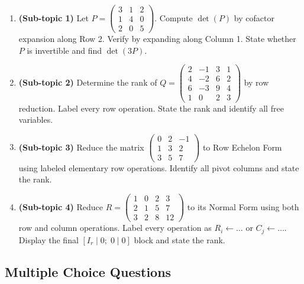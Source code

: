 \documentclass[12pt,a4paper]{article}
\begin{document}
\begin{enumerate}[label=\textbf{D\arabic*.}]
  \item \textbf{(Sub-topic 1)} Let $P = \begin{pmatrix}3&1&2\\1&4&0\\2&0&5\end{pmatrix}$. Compute $\det(P)$ by cofactor expansion along Row 2. Verify by expanding along Column 1. State whether $P$ is invertible and find $\det(3P)$.

  \item \textbf{(Sub-topic 2)} Determine the rank of $Q = \begin{pmatrix}2&-1&3&1\\4&-2&6&2\\6&-3&9&4\\1&0&2&3\end{pmatrix}$ by row reduction. Label every row operation. State the rank and identify all free variables.

  \item \textbf{(Sub-topic 3)} Reduce the matrix $\begin{pmatrix}0&2&-1\\1&3&2\\3&5&7\end{pmatrix}$ to Row Echelon Form using labeled elementary row operations. Identify all pivot columns and state the rank.

  \item \textbf{(Sub-topic 4)} Reduce $R = \begin{pmatrix}1&0&2&3\\2&1&5&7\\3&2&8&12\end{pmatrix}$ to its Normal Form using both row and column operations. Label every operation as $R_i \leftarrow \ldots$ or $C_j \leftarrow \ldots$. Display the final $[I_r \mid 0;\; 0 \mid 0]$ block and state the rank.
\end{enumerate}

\subsection*{Multiple Choice Questions}
\end{document}
